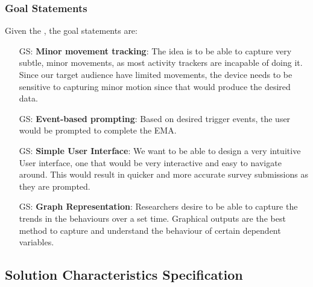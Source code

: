 \documentclass[12pt]{article}
\newcounter{goalnum} %
\begin{document}


\subsubsection{Goal Statements}

\noindent Given the , the goal statements are:

\begin{itemize}

  \item[GS\refstepcounter{goalnum}\thegoalnum \label{G_meaningfulLabel}:] \textbf{Minor movement tracking}: The idea is to be able to capture very subtle, minor movements, as most activity trackers are incapable of doing it. Since our target audience have limited movements, the device needs to be sensitive to capturing minor motion since that would produce the desired data.
  \item[GS\refstepcounter{goalnum}\thegoalnum \label{G_meaningfulLabel}:] \textbf{Event-based prompting}: Based on desired trigger events, the user would be prompted to complete the EMA.
  \item[GS\refstepcounter{goalnum}\thegoalnum \label{G_meaningfulLabel}:] \textbf{Simple User Interface}: We want to be able to design a very intuitive User interface, one that would be very interactive and easy to navigate around. This would result in quicker and more accurate survey submissions as they are prompted.
  \item[GS\refstepcounter{goalnum}\thegoalnum \label{G_meaningfulLabel}:] \textbf{Graph Representation}: Researchers desire to be able to capture the trends in the behaviours over a set time. Graphical outputs are the best method to capture and understand the behaviour of certain dependent variables.

\end{itemize}

\subsection{Solution Characteristics Specification}
\end{document}
